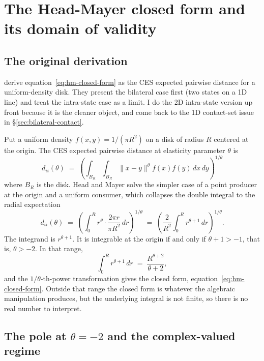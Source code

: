 \documentclass[11pt, letterpaper]{article}
\theoremstyle{definition}
\newcommand{\dii}{d_{ii}}
\begin{document}
\section{The Head-Mayer closed form and its domain of validity}
\label{sec:closed-form}

\subsection{The original derivation}
\citet{head_mayer_2002_illusory} derive equation~\eqref{eq:hm-closed-form}
as the CES expected pairwise distance for a uniform-density disk. They
present the bilateral case first (two states on a 1D line) and treat
the intra-state case as a limit. I do the 2D intra-state version up
front because it is the cleaner object, and come back to the 1D
contact-set issue in §\ref{sec:bilateral-contact}.

Put a uniform density $f(x,y) = 1/(\pi R^2)$ on a disk of radius $R$
centered at the origin. The CES expected pairwise distance at
elasticity parameter $\theta$ is
\begin{equation}
\dii(\theta) \;=\; \left( \int_{B_R} \int_{B_R} \|x - y\|^\theta f(x) f(y)\, dx\, dy \right)^{1/\theta}
\end{equation}
where $B_R$ is the disk. Head and Mayer solve the simpler case of a
point producer at the origin and a uniform consumer, which collapses
the double integral to the radial expectation
\begin{equation}
\dii(\theta) \;=\; \left( \int_0^R r^\theta \cdot \frac{2\pi r}{\pi R^2}\, dr \right)^{1/\theta}
\;=\; \left( \frac{2}{R^2} \int_0^R r^{\theta + 1}\, dr \right)^{1/\theta}.
\end{equation}
The integrand is $r^{\theta+1}$. It is integrable at the origin if and
only if $\theta + 1 > -1$, that is, $\theta > -2$. In that range,
\begin{equation}
\int_0^R r^{\theta + 1}\, dr \;=\; \frac{R^{\theta + 2}}{\theta + 2},
\end{equation}
and the $1/\theta$-th-power transformation gives the closed form,
equation~\eqref{eq:hm-closed-form}. Outside that range the closed form
is whatever the algebraic manipulation produces, but the underlying
integral is not finite, so there is no real number to interpret.

\subsection{The pole at $\theta = -2$ and the complex-valued regime}
\label{sec:pole}
\end{document}

